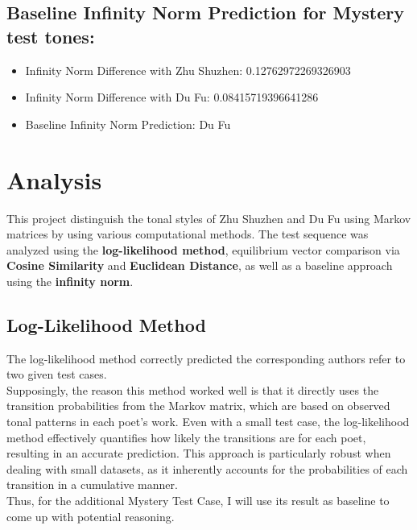 \documentclass[12pt]{article}
\begin{document}
\subsection*{Baseline Infinity Norm Prediction for Mystery test tones:}


\begin{itemize}
    \item Infinity Norm Difference with Zhu Shuzhen: 0.12762972269326903
    \item Infinity Norm Difference with Du Fu: 0.08415719396641286
    \item Baseline Infinity Norm Prediction: Du Fu
\end{itemize}

\section{Analysis}
This project distinguish the tonal styles of Zhu Shuzhen and Du Fu using Markov matrices by using various computational methods. The test sequence was analyzed using the \textbf{log-likelihood method}, equilibrium vector comparison via \textbf{Cosine Similarity} and \textbf{Euclidean Distance}, as well as a baseline approach using the \textbf{infinity norm}.

\subsection*{Log-Likelihood Method}

The log-likelihood method correctly predicted the corresponding authors refer to two given test cases.
\\
Supposingly, the reason this method worked well is that it directly uses the transition probabilities from the Markov matrix, which are based on observed tonal patterns in each poet's work. Even with a small test case, the log-likelihood method effectively quantifies how likely the transitions are for each poet, resulting in an accurate prediction. 
This approach is particularly robust when dealing with small datasets, as it inherently accounts for the probabilities of each transition in a cumulative manner.
\\
Thus, for the additional Mystery Test Case, I will use its result as baseline to come up with potential reasoning.
\end{document}
